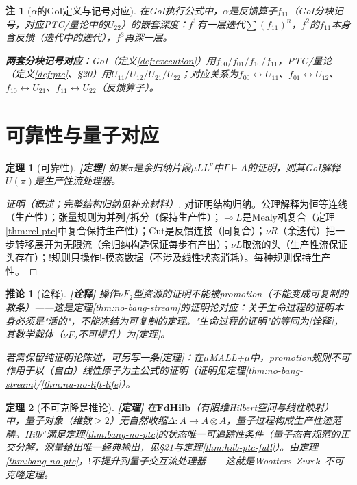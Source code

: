 \documentclass[11pt,a4paper]{article}
\newtheorem{theorem}{定理}
\newtheorem{corollary}{推论}
\newtheorem{remark}{注}
\newcommand{\lvl}[1]{\hfill\textbf{\footnotesize[#1]}}
\newcommand{\lvP}{\lvl{定理}}
\newcommand{\lvI}{\lvl{诠释}}
\newcommand{\bang}{{!}}
\newcommand{\tensor}{\otimes}
\begin{document}
\begin{remark}[$\alpha$的GoI定义与记号对应]
在GoI执行公式中，$\alpha$是反馈算子$f_{11}$（GoI分块记号，对应PTC/量论中的$U_{22}$）的嵌套深度：$f^1$有一层迭代$\sum(f_{11})^n$，$f^2$的$f_{11}$本身含反馈（迭代中的迭代），$f^3$再深一层。

\textbf{两套分块记号对应}：GoI（定义\ref{def:execution}）用$f_{00}/f_{01}/f_{10}/f_{11}$，PTC/量论（定义\ref{def:ptc}、§20）用$U_{11}/U_{12}/U_{21}/U_{22}$；对应关系为$f_{00}\leftrightarrow U_{11}$、$f_{01}\leftrightarrow U_{12}$、$f_{10}\leftrightarrow U_{21}$、$f_{11}\leftrightarrow U_{22}$（反馈算子）。
\end{remark}

\section{可靠性与量子对应}

\begin{theorem}[可靠性]\label{thm:soundness}\lvP
如果$\pi$是余归纳片段$\mu LL^\nu$中$\Gamma\vdash A$的证明，则其GoI解释$U(\pi)$是生产性流处理器。
\end{theorem}

\begin{proof}[证明（概述；完整结构归纳见补充材料）]
对证明结构归纳。公理解释为恒等连线（生产性）；张量规则为并列/拆分（保持生产性）；$\multimap L$是Mealy机复合（定理\ref{thm:rel-ptc}中复合保持生产性）；Cut是反馈连接（同复合）；$\nu R$（余迭代）把一步转移展开为无限流（余归纳构造保证每步有产出）；$\nu L$取流的头（生产性流保证头存在）；!规则只操作$\bang$-模态数据（不涉及线性状态消耗）。每种规则保持生产性。
\end{proof}

\begin{corollary}[诠释]\lvI
操作$\nu F_2$型资源的证明不能被promotion（不能变成可复制的教条）——这是定理\ref{thm:no-bang-stream}的证明论对应：关于生命过程的证明本身必须是"活的"，不能冻结为可复制的定理。"生命过程的证明"的等同为[诠释]，其数学载体（$\nu F_2$不可提升）为[定理]。

若需保留纯证明论陈述，可另写一条[定理]：在$\mu$MALL+$\mu$中，promotion规则不可作用于以（自由）线性原子为主公式的证明（证明见定理\ref{thm:no-bang-stream}/\ref{thm:nu-no-lift-life}）。
\end{corollary}

\begin{theorem}[不可克隆是推论]\label{thm:no-cloning-corollary}\lvP
在$\mathbf{FdHilb}$（有限维Hilbert空间与线性映射）中，量子对象（维数$\geq2$）无自然收缩$\Delta:A\to A\tensor A$，量子过程构成生产性迹范畴。Hilb$^\omega$满足定理\ref{thm:bang-no-ptc}的状态唯一可追踪性条件（量子态有规范的正交分解，测量给出唯一经典输出，见§21与定理\ref{thm:hilb-ptc-full}）。由定理\ref{thm:bang-no-ptc}，$\bang$不提升到量子交互流处理器——这就是Wootters--Zurek~\cite{wootters82}不可克隆定理。
\end{theorem}
\end{document}

